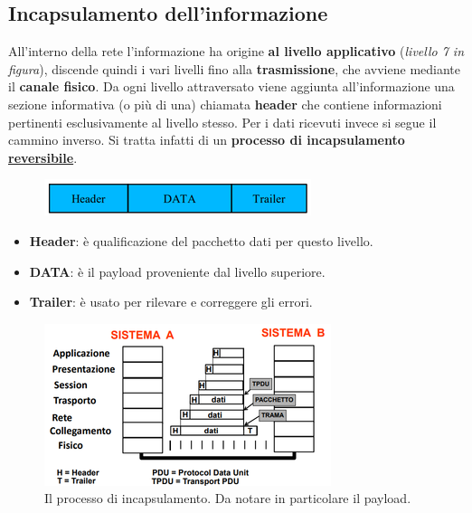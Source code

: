 \documentclass[11pt,a4paper]{article}
\theoremstyle{definition}
\begin{document}
\subsection{Incapsulamento dell'informazione}
All'interno della rete l'informazione ha origine \textbf{al livello
	applicativo} (\textit{livello 7 in figura}), discende quindi i vari livelli fino alla
\textbf{trasmissione}, che avviene mediante il \textbf{canale fisico}.
Da ogni livello attraversato viene aggiunta all'informazione una sezione informativa (o più di una) chiamata \textbf{header} che contiene informazioni pertinenti esclusivamente al livello stesso.
Per i dati ricevuti invece si segue il cammino inverso. Si tratta infatti di un \textbf{processo di incapsulamento \underline{reversibile}}.
\begin{figure}[!h]
	\includegraphics[scale=0.5]{Immagini/Incapsulamento.png}
	\centering
\end{figure}
\begin{itemize}
	\item \textbf{Header}: è qualificazione del pacchetto dati per questo livello.
	\item \textbf{DATA}: è il payload proveniente dal livello superiore.
	\item \textbf{Trailer}: è usato per rilevare e correggere gli errori.
\end{itemize}

\begin{figure}[!h]
	\includegraphics[scale=0.7]{Immagini/Incaps_2.png}
	\centering
	\caption{Il processo di incapsulamento. Da notare in particolare il payload.}
\end{figure}
\newpage
\end{document}
